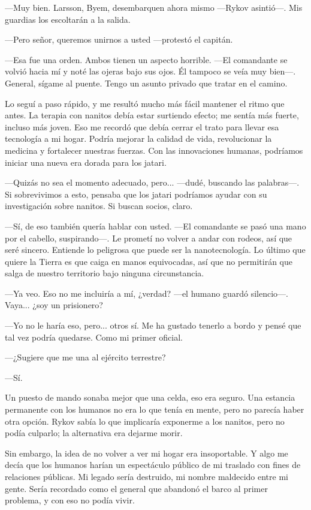 —Muy bien. Larsson, Byem, desembarquen ahora mismo —Rykov asintió—. Mis guardias los escoltarán a la salida.

—Pero señor, queremos unirnos a usted —protestó el capitán.

—Esa fue una orden. Ambos tienen un aspecto horrible. —El comandante se volvió hacia mí y noté las ojeras bajo sus ojos. Él tampoco se veía muy bien—. General, sígame al puente. Tengo un asunto privado que tratar en el camino.

Lo seguí a paso rápido, y me resultó mucho más fácil mantener el ritmo que antes. La terapia con nanitos debía estar surtiendo efecto; me sentía más fuerte, incluso más joven. Eso me recordó que debía cerrar el trato para llevar esa tecnología a mi hogar. Podría mejorar la calidad de vida, revolucionar la medicina y fortalecer nuestras fuerzas. Con las innovaciones humanas, podríamos iniciar una nueva era dorada para los jatari.

—Quizás no sea el momento adecuado, pero... —dudé, buscando las palabras—. Si sobrevivimos a esto, pensaba que los jatari podríamos ayudar con su investigación sobre nanitos. Si buscan socios, claro.

—Sí, de eso también quería hablar con usted. —El comandante se pasó una mano por el cabello, suspirando—. Le prometí no volver a andar con rodeos, así que seré sincero. Entiende lo peligrosa que puede ser la nanotecnología. Lo último que quiere la Tierra es que caiga en manos equivocadas, así que no permitirán que salga de nuestro territorio bajo ninguna circunstancia.

—Ya veo. Eso no me incluiría a mí, ¿verdad? —el humano guardó silencio—. Vaya... ¿soy un prisionero?

—Yo no le haría eso, pero... otros sí. Me ha gustado tenerlo a bordo y pensé que tal vez podría quedarse. Como mi primer oficial.

 —¿Sugiere que me una al ejército terrestre?

—Sí.

Un puesto de mando sonaba mejor que una celda, eso era seguro. Una estancia permanente con los humanos no era lo que tenía en mente, pero no parecía haber otra opción. Rykov sabía lo que implicaría exponerme a los nanitos, pero no podía culparlo; la alternativa era dejarme morir.

Sin embargo, la idea de no volver a ver mi hogar era insoportable. Y algo me decía que los humanos harían un espectáculo público de mi traslado con fines de relaciones públicas. Mi legado sería destruido, mi nombre maldecido entre mi gente. Sería recordado como el general que abandonó el barco al primer problema, y con eso no podía vivir.

